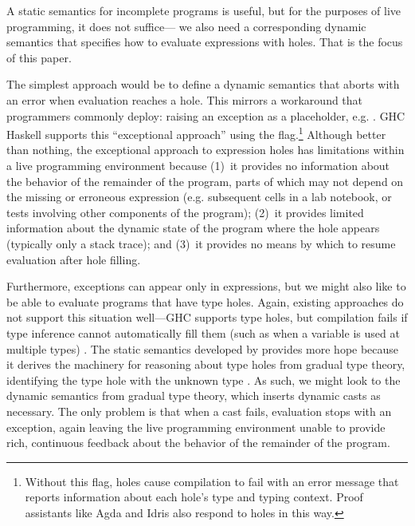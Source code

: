 %
A static semantics for incomplete programs is useful, but for the purposes of live programming, it does not suffice---%
we also need a corresponding dynamic semantics that specifies how to evaluate expressions with holes. That is the focus of this paper. %
%

The simplest approach would be to define a dynamic semantics that aborts with an error when evaluation reaches a hole. 
%
This mirrors a workaround that programmers commonly deploy: 
raising an exception as a placeholder, e.g. . 
GHC Haskell supports this ``exceptional approach'' using the  flag.\footnote{
Without this flag, holes cause compilation to fail with an error message that reports information about each hole's type and typing context. 
Proof assistants like Agda \cite{norell:thesis,norell2009dependently} and Idris \cite{brady2013idris} also respond to holes in this way.
} 
Although better than nothing, the exceptional approach to expression holes has limitations 
within a live programming environment because 
(1)~it provides no information about the behavior of the remainder of the program, 
parts of which may not depend on the missing or erroneous expression (e.g. subsequent cells in a lab notebook, or tests involving other components of the program);  
(2)~it provides limited information about the dynamic state of the program where the hole appears 
(typically only a stack trace);  and
(3)~it provides no means by which to resume evaluation after hole filling.

Furthermore, exceptions can appear only in expressions, but we might also like to be able to evaluate programs that have type holes. Again, existing approaches do not support this situation well---GHC supports type holes, but compilation fails if type inference cannot automatically fill them (such as when a variable is used at multiple types) \cite{GHCHoles}. 
The static semantics developed by \citet{popl-paper} provides more hope because it derives the machinery for 
reasoning about type holes from gradual type theory, 
identifying the type hole with the unknown type \cite{DBLP:conf/snapl/SiekVCB15,Siek06a}.
%
As such, we might look to the dynamic semantics from
gradual type theory, 
which inserts dynamic casts as necessary. 
The only problem is that when a cast fails, evaluation stops with 
an exception, again leaving the live programming environment unable to provide rich, continuous feedback about the behavior of the remainder of the program.

